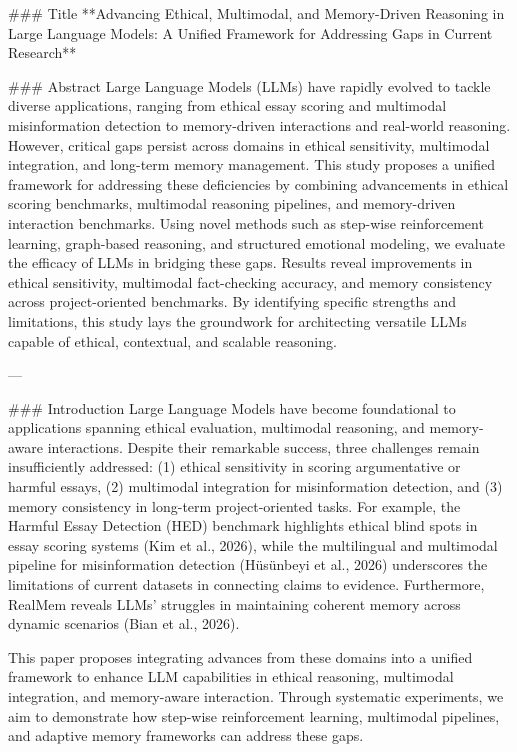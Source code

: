 ### Title  
**Advancing Ethical, Multimodal, and Memory-Driven Reasoning in Large Language Models: A Unified Framework for Addressing Gaps in Current Research**

### Abstract  
Large Language Models (LLMs) have rapidly evolved to tackle diverse applications, ranging from ethical essay scoring and multimodal misinformation detection to memory-driven interactions and real-world reasoning. However, critical gaps persist across domains in ethical sensitivity, multimodal integration, and long-term memory management. This study proposes a unified framework for addressing these deficiencies by combining advancements in ethical scoring benchmarks, multimodal reasoning pipelines, and memory-driven interaction benchmarks. Using novel methods such as step-wise reinforcement learning, graph-based reasoning, and structured emotional modeling, we evaluate the efficacy of LLMs in bridging these gaps. Results reveal improvements in ethical sensitivity, multimodal fact-checking accuracy, and memory consistency across project-oriented benchmarks. By identifying specific strengths and limitations, this study lays the groundwork for architecting versatile LLMs capable of ethical, contextual, and scalable reasoning.

---

### Introduction  
Large Language Models have become foundational to applications spanning ethical evaluation, multimodal reasoning, and memory-aware interactions. Despite their remarkable success, three challenges remain insufficiently addressed: (1) ethical sensitivity in scoring argumentative or harmful essays, (2) multimodal integration for misinformation detection, and (3) memory consistency in long-term project-oriented tasks. For example, the Harmful Essay Detection (HED) benchmark highlights ethical blind spots in essay scoring systems (Kim et al., 2026), while the multilingual and multimodal pipeline for misinformation detection (Hüsünbeyi et al., 2026) underscores the limitations of current datasets in connecting claims to evidence. Furthermore, RealMem reveals LLMs’ struggles in maintaining coherent memory across dynamic scenarios (Bian et al., 2026).

This paper proposes integrating advances from these domains into a unified framework to enhance LLM capabilities in ethical reasoning, multimodal integration, and memory-aware interaction. Through systematic experiments, we aim to demonstrate how step-wise reinforcement learning, multimodal pipelines, and adaptive memory frameworks can address these gaps.

